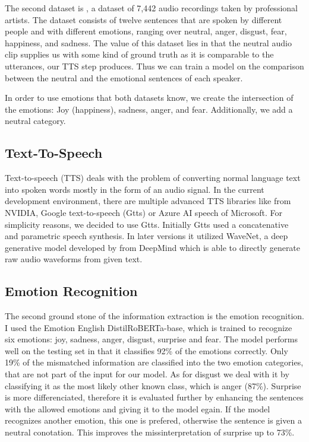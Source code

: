 \documentclass[11pt]{article}
\begin{document}
The second dataset is \cite{cao_data}, a dataset of 7,442 audio recordings taken by professional artists. The dataset consists of twelve sentences that are spoken by different people and with different emotions, ranging over neutral, anger, disgust, fear, happiness, and sadness. The value of this dataset lies in that the neutral audio clip supplies us with some kind of ground truth as it is comparable to the utterances, our TTS step produces. Thus we can train a model on the comparison between the neutral and the emotional sentences of each speaker.

In order to use emotions that both datasets know, we create the intersection of the emotions: Joy (happiness), sadness, anger, and fear. Additionally, we add a neutral category.
\subsection{Text-To-Speech}
Text-to-speech (TTS) deals with the problem of converting normal language text into spoken words mostly in the form of an audio signal. 
In the current development environment, there are multiple advanced TTS libraries like \cite{shen_natural_2018} from NVIDIA, Google text-to-speech (Gtts) \cite{gtts} or Azure AI speech of Microsoft. For simplicity reasons, we decided to use Gtts. Initially Gtts used a concatenative and parametric speech synthesis. In later versions it utilized WaveNet, a deep generative model developed by \citeauthor{van2016wavenet} from DeepMind which is able to directly generate raw audio waveforms from given text. 
\subsection{Emotion Recognition}

The second ground stone of the information extraction is the emotion recognition. I used the Emotion English DistilRoBERTa-base\cite{hartmann2022emotionenglish}, which is trained to recognize six emotions: joy, sadness, anger, disgust, surprise and fear. The model performs well on the testing set in that it classifies 92\% of the emotions correctly. Only 19\% of the mismatched information are classified into the two emotion categories, that are not part of the input for our model. As for disgust we deal with it by classifying it as the most likely other known class, which is anger (87\%). Surprise is more differenciated, therefore it is evaluated further by enhancing the sentences with the allowed emotions and giving it to the model egain. If the model recognizes another emotion, this one is prefered, otherwise the sentence is given a neutral conotation. This improves the missinterpretation of surprise up to 73\%.
\end{document}
